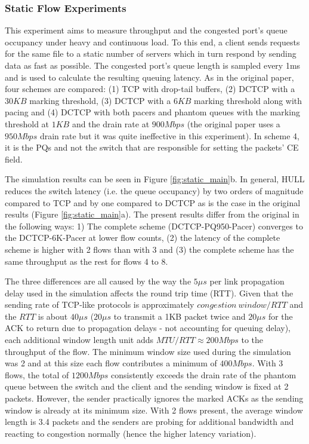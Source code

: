 \documentclass[10pt,conference,compsocconf]{IEEEtran}
\begin{document}
\subsubsection*{\textbf{Static Flow Experiments}}


This experiment aims to measure throughput and the congested port's queue occupancy under heavy and continuous load. To this end, a client sends requests for the same file to a static number of servers which in turn respond by sending data as fast as possible. The congested port's queue length is sampled every 1ms and is used to calculate the resulting queuing latency. As in the original paper, four schemes are compared: (1) TCP with drop-tail buffers, (2) DCTCP with a $30KB$ marking threshold, (3) DCTCP with a $6KB$ marking threshold along with pacing and (4) DCTCP with both pacers and phantom queues with the marking threshold at $1KB$ and the drain rate at $900Mbps$ (the original paper uses a $950Mbps$ drain rate but it was quite ineffective in this experiment). In scheme 4, it is the PQs and not the switch that are responsible for setting the packets' CE field.



The simulation results can be seen in Figure \ref{fig:static_main}b. In general, HULL reduces the switch latency (i.e. the queue occupancy) by two orders of magnitude compared to TCP and by one compared to DCTCP as is the case in the original results (Figure \ref{fig:static_main}a). The present results differ from the original in the following ways: 1) The complete scheme (DCTCP-PQ950-Pacer) converges to the DCTCP-6K-Pacer at lower flow counts, (2) the latency of the complete scheme is higher with 2 flows than with 3 and (3) the complete scheme has the same throughput as the rest for flows 4 to 8.%

The three differences are all caused by the way the $5\mu s$ per link propagation delay used in the simulation affects the round trip time (RTT). Given that the sending rate of TCP-like protocols is approximately $congestion\: window/RTT$ and the $RTT$ is about $40\mu s$ ($20\mu s$ to transmit a 1KB packet twice and $20\mu s$ for the ACK to return due to propagation delays - not accounting for queuing delay), each additional window length unit adds $MTU/RTT\approx 200Mbps$ to the throughput of the flow. The minimum window size used during the simulation was 2 and at this size each flow contributes a minimum of $400Mbps$. With 3 flows, the total of $1200Mbps$ consistently exceeds the drain rate of the phantom queue between the switch and the client and the sending window is fixed at 2 packets. However, the sender practically ignores the marked ACKs as the sending window is already at its minimum size. With 2 flows present, the average window length is 3.4 packets and the senders are probing for additional bandwidth and reacting to congestion normally (hence the higher latency variation). %
\end{document}

